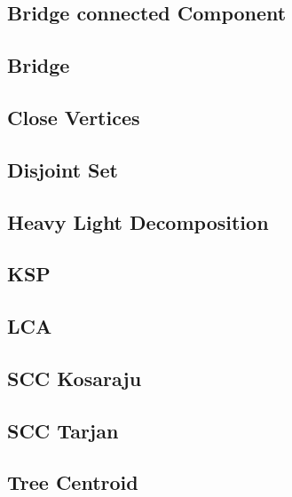 \documentclass[a4paper,10pt,twocolumn,oneside]{article}
\begin{document}
\subsection{Bridge connected Component}


\subsection{Bridge}


\subsection{Close Vertices}


\subsection{Disjoint Set}


\subsection{Heavy Light Decomposition}


\subsection{KSP}


\subsection{LCA}


\subsection{SCC Kosaraju}


\subsection{SCC Tarjan}


\subsection{Tree Centroid}

\end{document}
